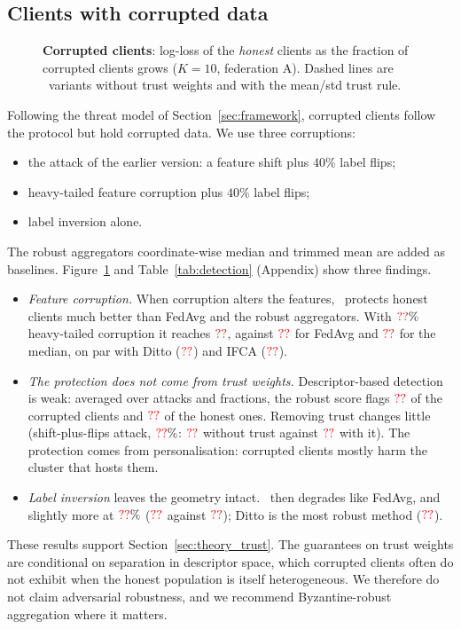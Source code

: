 \subsection{Clients with corrupted data}
\label{sec:e_robust}

\begin{figure}[t]
\centering
{}
\caption{\textbf{Corrupted clients}: log-loss of the \emph{honest} clients as the fraction
of corrupted clients grows ($K=10$, federation A). Dashed lines are \ptopofl\ variants
without trust weights and with the mean/std trust rule.}
\label{fig:robust}
\end{figure}

Following the threat model of Section~\ref{sec:framework}, corrupted clients follow the
protocol but hold corrupted data. We use three corruptions:
\begin{itemize}[leftmargin=1.2em,itemsep=2pt]
  \item the attack of the earlier version: a feature shift plus $40\%$ label flips;
  \item heavy-tailed feature corruption plus $40\%$ label flips;
  \item label inversion alone.
\end{itemize}
The robust aggregators coordinate-wise median and trimmed mean \citep{yin2018byzantine} are
added as baselines. Figure~\ref{fig:robust} and Table~\ref{tab:detection} (Appendix) show
three findings.
\begin{itemize}[leftmargin=1.2em,itemsep=2pt]
  \item \emph{Feature corruption.} When corruption alters the features, \ptopofl\ protects
    honest clients much better than FedAvg and the robust aggregators. With
    $\textcolor{red}{??}\%$ heavy-tailed corruption it reaches $\textcolor{red}{??}$, against
    $\textcolor{red}{??}$ for FedAvg and $\textcolor{red}{??}$ for the median, on par with Ditto
    ($\textcolor{red}{??}$) and IFCA ($\textcolor{red}{??}$).
  \item \emph{The protection does not come from trust weights.} Descriptor-based detection
    is weak: averaged over attacks and fractions, the robust score flags
    $\textcolor{red}{??}$ of the corrupted clients and $\textcolor{red}{??}$ of the honest ones. Removing trust
    changes little (shift-plus-flips attack, $\textcolor{red}{??}\%$: $\textcolor{red}{??}$ without trust
    against $\textcolor{red}{??}$ with it). The protection comes from personalisation: corrupted
    clients mostly harm the cluster that hosts them.
  \item \emph{Label inversion} leaves the geometry intact. \ptopofl\ then degrades like
    FedAvg, and slightly more at $\textcolor{red}{??}\%$ ($\textcolor{red}{??}$ against
    $\textcolor{red}{??}$); Ditto is the most robust method ($\textcolor{red}{??}$).
\end{itemize}
These results support Section~\ref{sec:theory_trust}. The guarantees on trust weights are
conditional on separation in descriptor space, which corrupted clients often do not exhibit
when the honest population is itself heterogeneous. We therefore do not claim adversarial
robustness, and we recommend Byzantine-robust aggregation where it matters.

